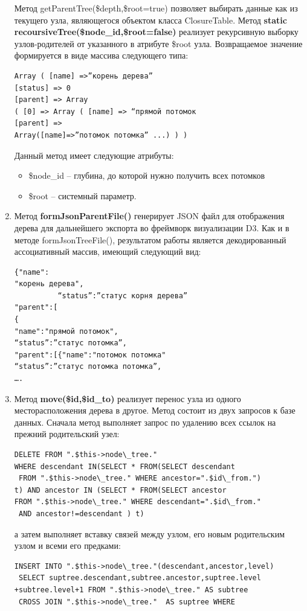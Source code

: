 \documentclass[a4paper,14pt]{extreport}
\theoremstyle{definition}
\begin{document}
\begin{enumerate}
Метод getParentTree(\$depth,\$root=true) позволяет выбирать данные как из текущего узла, являющегося объектом класса ClosureTable.
Метод \textbf{ static recoursiveTree(\$node\_id,\$root=false)} реализует рекурсивную выборку узлов-родителей от указанного в атрибуте \$root узла. Возвращаемое значение формируется в виде массива следующего типа:
\begin{verbatim}Array ( [name] =>”корень дерева”
[status] => 0
[parent] => Array
( [0] => Array ( [name] => “прямой потомок
[parent] =>
Array([name]=>”потомок потомка” ...) ) )\end{verbatim}
Данный метод имеет следующие атрибуты:
\begin{itemize}
\item \$node\_id – глубина, до которой нужно получить всех потомков
\item \$root – системный параметр.
\end{itemize}
\item  Метод \textbf{formJsonParentFile()} генерирует JSON файл для отображения дерева для дальнейшего экспорта во фреймворк визуализации D3. Как и в методе formJsonTreeFile(), результатом работы является декодированный ассоциативный массив, имеющий следующий вид:
\begin{verbatim}{"name":
"корень дерева",
          “status”:”статус корня дерева”
"parent":[
{
"name":"прямой потомок",
“status”:”статус потомка”,
"parent":[{"name":"потомок потомка"
“status”:”статус потомка потомка”,
….\end{verbatim}
\item Метод \textbf{move(\$id,\$id\_to)} реализует перенос узла из одного месторасположения дерева в другое. Метод состоит из двух запросов к базе данных. Сначала метод выполняет запрос по удалению всех ссылок на прежний родительский узел:
\begin{verbatim}DELETE FROM ".$this->node\_tree."
WHERE descendant IN(SELECT * FROM(SELECT descendant
 FROM ".$this->node\_tree." WHERE ancestor=".$id\_from.")
t) AND ancestor IN (SELECT * FROM(SELECT ancestor
FROM ".$this->node\_tree." WHERE descendant=".$id\_from."
 AND ancestor!=descendant ) t)\end{verbatim}
а затем выполняет вставку связей между узлом, его новым родительским узлом и всеми его предками:
\begin{verbatim}INSERT INTO ".$this->node\_tree."(descendant,ancestor,level)
 SELECT suptree.descendant,subtree.ancestor,suptree.level
+subtree.level+1 FROM ".$this->node\_tree." AS subtree
 CROSS JOIN ".$this->node\_tree."  AS suptree WHERE

\end{verbatim}
\end{enumerate}
\end{document}
